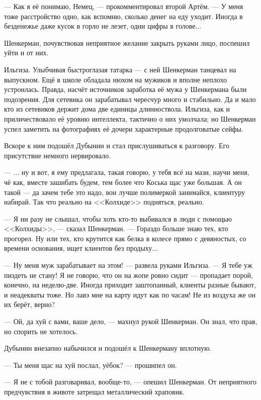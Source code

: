 \documentclass[a4paper,10pt,fleqn]{book}\usepackage{polyglossia}\setdefaultlanguage{english}\setotherlanguage{russian}\defaultfontfeatures{Ligatures=TeX,Mapping=tex-text} \usepackage{xcolor}\definecolor{lightgray}{HTML}{bbbbbb}\color{lightgray}\newcommand{\ml}[3]{\textcolor{black}{#3}}
\begin{document}
--- Как я её понимаю, Немец, --- прокомментировал второй Артём.
--- У меня тоже расстройство одно, как вспомню, сколько денег на еду уходит.
Иногда в безденежье даже кусок в горло не лезет, одни цифры в голове...

Шенкерман, почувствовав неприятное желание закрыть руками лицо, поспешил уйти и от них.

Ильгиза.
Улыбчивая быстроглазая татарка --- с ней Шенкерман танцевал на выпускном.
Ещё в школе обладала нюхом на мужиков и вполне неплохо устроилась.
Правда, насчёт источников заработка её мужа у Шенкермана были подозрения.
Для сетевика он зарабатывал чересчур много и стабильно.
Да и мало кто из сетевиков держит дома две единицы длинноствола.
Ильгиза, как и приличествовало её уровню интеллекта, тактично о них умолчала;
но Шенкерман успел заметить на фотографиях её дочери характерные продолговатые сейфы.

Вскоре к ним подошёл Дубынин и стал прислушиваться к разговору.
Его присутствие немного нервировало.

---  ... ну и вот, я ему предлагала, такая говорю, у тебя всё на мази, научи меня, чё как, вместе зашибать будем, тем более что Коська щас уже большая.
А он такой --- да зачем тебе это надо, вон лучше полимеркой занимайся, клиентуру набирай.
Так что реально на <<Колхиде>> подняться, реально.

--- Я ни разу не слышал, чтобы хоть кто-то выбивался в люди с помощью <<Колхиды>>, --- сказал Шенкерман.
--- Гораздо больше знаю тех, кто прогорел.
Ну или тех, кто крутится как белка в колесе прямо с девяностых, со времени основания, ищет клиентов без продыху...

--- Ну меня муж зарабатывает на этом! --- развела руками Ильгиза.
--- Я тебе уж пиздеть не стану!
Я не говорю, что он на жопе ровно сидит --- пропадает порой, конечно, на неделю-две.
Иногда приходит заштопанный, клиенты разные бывают, и неадекваты тоже.
Но лавэ мне на карту идут как по часам!
Не из воздуха же он их берёт, верно?

--- Ой, да хуй с вами, ваше дело, --- махнул рукой Шенкерман.
Он знал, что прав, но спорить не хотелось.

Дубынин внезапно набычился и подошёл к Шенкерману вплотную.

--- Ты меня щас на хуй послал, уёбок? --- прошипел он.

--- Я не с тобой разговаривал, вообще-то, --- опешил Шенкерман.
От неприятного предчувствия в животе затрещал металлический храповик.
\end{document}

